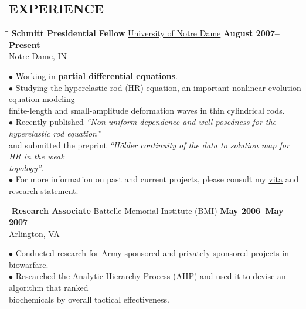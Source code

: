 \documentclass{resume}
\begin{document}
\begin{resume}
		 \section{EXPERIENCE}
	\vspace{-0.1in}	
    \begin{tabbing}
		\hspace{2.3in}\= \hspace{2.6in}\= \kill
        {\bf Schmitt Presidential Fellow} \>\href{http://nd.edu/}{University of Notre Dame}     
	\>\textbf{August 2007--Present} \\
		\>Notre Dame, IN 
	\end{tabbing}\vspace{-15pt}    
	$\bullet$ Working in \textbf{partial differential equations}.  
\\
$\bullet$ Studying the hyperelastic rod (HR) equation, an important nonlinear evolution
equation modeling \\
\phantom{$\bullet$} finite-length and small-amplitude deformation waves in
thin cylindrical rods. 
\\
$\bullet$ Recently published \textit{``Non-uniform dependence and well-posedness for the hyperelastic rod
equation''} \\
\phantom{$\bullet$} and submitted the preprint \textit{``H\"older continuity of the data to solution map for HR in the weak \\
\phantom{$\bullet$} topology''}. 
\\
$\bullet$ For more information on past and current projects, please consult
my \href{http://davidkarapetyan.com/pdfs/cv.pdf}{vita} and
\href{http://davidkarapetyan.com/pdfs/research-statement.pdf}{research
statement}. 	
	\begin{tabbing}
		\hspace{2.3in}\= \hspace{2.6in}\= \kill
        {\bf Research Associate} \>\href{http://www.battelle.org/}{Battelle
        Memorial Institute (BMI)}     
	\>\textbf{May 2006--May 2007} \\
		\>Arlington, VA
	\end{tabbing}\vspace{-15pt}    
	$\bullet$ Conducted research for Army sponsored and privately sponsored projects 
	in biowarfare. \\ 
      $\bullet$ Researched the Analytic Hierarchy Process 
	(AHP) and used it to devise an algorithm that ranked \\
	\phantom{$\bullet$} biochemicals by 
	overall tactical effectiveness.

\end{resume}
\end{document}

